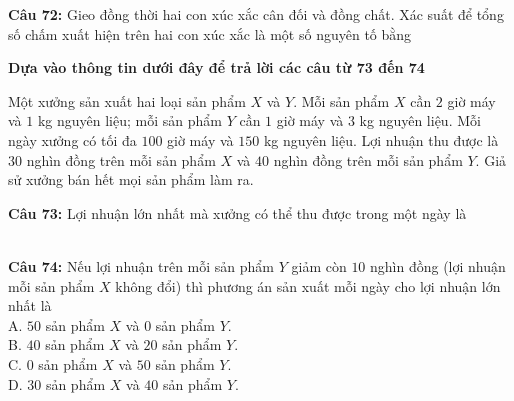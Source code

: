 \documentclass[12pt,a4paper]{article}
\begin{document}


\vspace{0.3cm}

\noindent \textbf{Câu 72:} Gieo đồng thời hai con xúc xắc cân đối và đồng chất. Xác suất để tổng số chấm xuất hiện trên hai con xúc xắc là một số nguyên tố bằng\\
\noindent{}



\vspace{0.5cm}
\noindent\textbf{Dựa vào thông tin dưới đây để trả lời các câu từ 73 đến 74}%


\par\nobreak

Một xưởng sản xuất hai loại sản phẩm $X$ và $Y$. Mỗi sản phẩm $X$ cần $2$ giờ máy và $1$ kg nguyên liệu; mỗi sản phẩm $Y$ cần $1$ giờ máy và $3$ kg nguyên liệu. Mỗi ngày xưởng có tối đa $100$ giờ máy và $150$ kg nguyên liệu. Lợi nhuận thu được là $30$ nghìn đồng trên mỗi sản phẩm $X$ và $40$ nghìn đồng trên mỗi sản phẩm $Y$. Giả sử xưởng bán hết mọi sản phẩm làm ra.

\par\nobreak


\noindent \textbf{Câu 73:} Lợi nhuận lớn nhất mà xưởng có thể thu được trong một ngày là\\
\noindent{}\\
\noindent{}



\vspace{0.3cm}

\noindent \textbf{Câu 74:} Nếu lợi nhuận trên mỗi sản phẩm $Y$ giảm còn $10$ nghìn đồng (lợi nhuận mỗi sản phẩm $X$ không đổi) thì phương án sản xuất mỗi ngày cho lợi nhuận lớn nhất là\\
\noindent A. $50$ sản phẩm $X$ và $0$ sản phẩm $Y$.\\
\noindent B. $40$ sản phẩm $X$ và $20$ sản phẩm $Y$.\\
\noindent C. $0$ sản phẩm $X$ và $50$ sản phẩm $Y$.\\
\noindent D. $30$ sản phẩm $X$ và $40$ sản phẩm $Y$.
\end{document}
